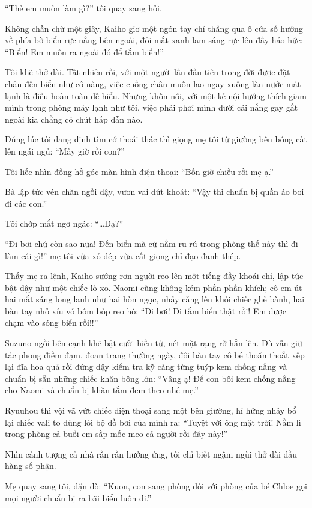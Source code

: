 \documentclass[../main.tex]{subfiles}
\begin{document}
``Thế em muốn làm gì?'' tôi quay sang hỏi.

Không chần chừ một giây, Kaiho giơ một ngón tay chỉ thẳng qua ô cửa sổ hướng về phía bờ biển rực nắng bên ngoài, đôi mắt xanh lam sáng rực lên đầy háo hức: ``Biển! Em muốn ra ngoài đó để tắm biển!''

Tôi khẽ thở dài. Tất nhiên rồi, với một người lần đầu tiên trong đời được đặt chân đến biển như cô nàng, việc cuồng chân muốn lao ngay xuống làn nước mát lạnh là điều hoàn toàn dễ hiểu. Nhưng khốn nỗi, với một kẻ nội hướng thích giam mình trong phòng máy lạnh như tôi, việc phải phơi mình dưới cái nắng gay gắt ngoài kia chẳng có chút hấp dẫn nào.

Đúng lúc tôi đang định tìm cớ thoái thác thì giọng mẹ tôi từ giường bên bỗng cất lên ngái ngủ: ``Mấy giờ rồi con?''

Tôi liếc nhìn đồng hồ góc màn hình điện thoại: ``Bốn giờ chiều rồi mẹ ạ.''

Bà lập tức vén chăn ngồi dậy, vươn vai dứt khoát: ``Vậy thì chuẩn bị quần áo bơi đi các con.''

Tôi chớp mắt ngơ ngác: ``\dots Dạ?''

``Đi bơi chứ còn sao nữa! Đến biển mà cứ nằm ru rú trong phòng thế này thì đi làm cái gì!'' mẹ tôi vừa xỏ dép vừa cất giọng chỉ đạo đanh thép.

Thấy mẹ ra lệnh, Kaiho sướng rơn người reo lên một tiếng đầy khoái chí, lập tức bật dậy như một chiếc lò xo. Naomi cũng không kém phần phấn khích; cô em út hai mắt sáng long lanh như hai hòn ngọc, nhảy cẫng lên khỏi chiếc ghế bành, hai bàn tay nhỏ xíu vỗ bôm bốp reo hò: ``Đi bơi! Đi tắm biển thật rồi! Em được chạm vào sóng biển rồi!!''

Suzuno ngồi bên cạnh khẽ bật cười hiền từ, nét mặt rạng rỡ hẳn lên. Dù vẫn giữ tác phong điềm đạm, đoan trang thường ngày, đôi bàn tay cô bé thoăn thoắt xếp lại đĩa hoa quả rồi đứng dậy kiểm tra kỹ càng từng tuýp kem chống nắng và chuẩn bị sẵn những chiếc khăn bông lớn: ``Vâng ạ! Để con bôi kem chống nắng cho Naomi và chuẩn bị khăn tắm đem theo nhé mẹ.''

Ryuuhou thì vội vã vứt chiếc điện thoại sang một bên giường, hí hửng nhảy bổ lại chiếc vali to đùng lôi bộ đồ bơi của mình ra: ``Tuyệt vời ông mặt trời! Nằm lì trong phòng cả buổi em sắp mốc meo cả người rồi đây này!''

Nhìn cảnh tượng cả nhà rần rần hưởng ứng, tôi chỉ biết ngậm ngùi thở dài đầu hàng số phận.

Mẹ quay sang tôi, dặn dò: ``Kuon, con sang phòng đối với phòng của bé Chloe gọi mọi người chuẩn bị ra bãi biển luôn đi.''
\end{document}
